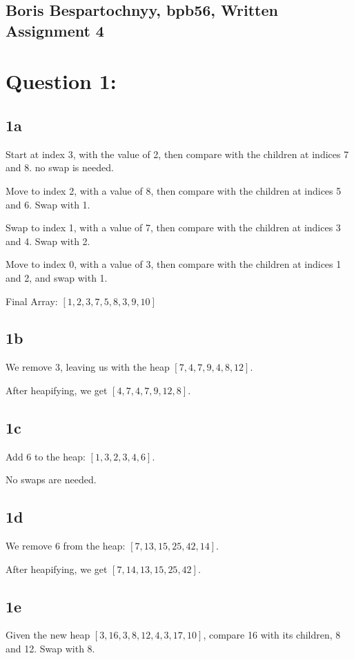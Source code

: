 \documentclass{article}
\begin{document}
\subsection*{Boris Bespartochnyy, bpb56, Written Assignment 4}
\section*{Question 1:}

\subsection*{1a}
Start at index 3, with the value of 2, then compare with the children at indices 7 and 8. no swap is needed.  

Move to index 2, with a value of 8, then compare with the children at indices 5 and 6. Swap with 1.  

Swap to index 1, with a value of 7, then compare with the children at indices 3 and 4. Swap with 2.  

Move to index 0, with a value of 3, then compare with the children at indices 1 and 2, and swap with 1.

Final Array: \([1, 2, 3, 7, 5, 8, 3, 9, 10]\)

\subsection*{1b}
We remove 3, leaving us with the heap \([7, 4, 7, 9, 4, 8, 12]\).  

After heapifying, we get \([4, 7, 4, 7, 9, 12, 8]\).

\subsection*{1c}
Add 6 to the heap: \([1, 3, 2, 3, 4, 6]\).  

No swaps are needed.

\subsection*{1d}
We remove 6 from the heap: \([7, 13, 15, 25, 42, 14]\).  

After heapifying, we get \([7, 14, 13, 15, 25, 42]\).

\subsection*{1e}
Given the new heap \([3, 16, 3, 8, 12, 4, 3, 17, 10]\), compare 16 with its children, 8 and 12. Swap with 8.  
\end{document}
